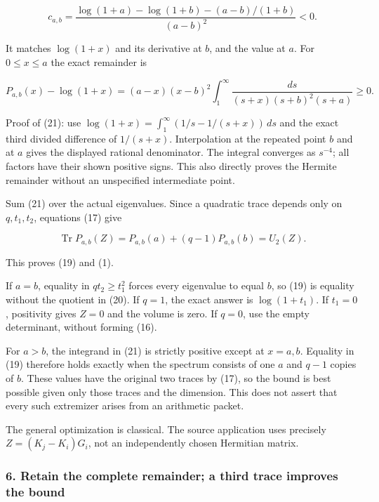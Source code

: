 \[
 c_{a,b}=
 \frac{\log(1+a)-\log(1+b)-(a-b)/(1+b)}{(a-b)^2}<0.              \tag{20}
\]

It matches \(\log(1+x)\) and its derivative at \(b\), and the value at \(a\). For \(0\le x\le a\) the exact remainder is

\[
 \boxed{
 P_{a,b}(x)-\log(1+x)
 =(a-x)(x-b)^2
 \int_1^\infty\frac{ds}{(s+x)(s+b)^2(s+a)}\ge0.
 }                                                             \tag{21}
\]

Proof of (21): use \(\log(1+x)=\int_1^\infty(1/s-1/(s+x))\,ds\) and the exact third divided difference of \(1/(s+x)\). Interpolation at the repeated point \(b\) and at \(a\) gives the displayed rational denominator. The integral converges as \(s^{-4}\); all factors have their shown positive signs. This also directly proves the Hermite remainder without an unspecified intermediate point.

Sum (21) over the actual eigenvalues. Since a quadratic trace depends only on \(q,t_1,t_2\), equations (17) give

\[
 \operatorname{Tr}P_{a,b}(Z)=P_{a,b}(a)+(q-1)P_{a,b}(b)=U_2(Z).
\]

This proves (19) and (1).

If \(a=b\), equality in \(qt_2\ge t_1^2\) forces every eigenvalue to equal \(b\), so (19) is equality without the quotient in (20). If \(q=1\), the exact answer is \(\log(1+t_1)\). If \(t_1=0\), positivity gives \(Z=0\) and the volume is zero. If \(q=0\), use the empty determinant, without forming (16).

For \(a>b\), the integrand in (21) is strictly positive except at \(x=a,b\). Equality in (19) therefore holds exactly when the spectrum consists of one \(a\) and \(q-1\) copies of \(b\). These values have the original two traces by (17), so the bound is best possible given only those traces and the dimension. This does not assert that every such extremizer arises from an arithmetic packet.

The general optimization is classical. The source application uses precisely \(Z=(K_j-K_i)G_i\), not an independently chosen Hermitian matrix.

\subsubsection{6. Retain the complete remainder; a third trace improves the bound}\label{endpoint-relation_moment_original--retain-the-complete-remainder-a-third-trace-improves-the-bound}

